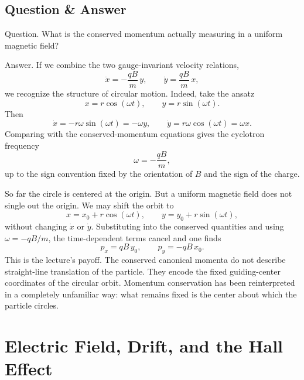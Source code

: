 \subsection{Question \& Answer}

Question. What is the conserved momentum actually measuring in a uniform magnetic field?

Answer. If we combine the two gauge-invariant velocity relations,
\begin{equation}
\dot x=-\frac{qB}{m}\,y,
\qquad
\dot y=\frac{qB}{m}\,x,
\end{equation}
we recognize the structure of circular motion. Indeed, take the ansatz
\begin{equation}
x=r\cos(\omega t),
\qquad
y=r\sin(\omega t).
\end{equation}
Then
\begin{equation}
\dot x=-r\omega\sin(\omega t)=-\omega y,
\qquad
\dot y=r\omega\cos(\omega t)=\omega x.
\end{equation}
Comparing with the conserved-momentum equations gives the cyclotron frequency
\begin{equation}
\omega=-\frac{qB}{m},
\end{equation}
up to the sign convention fixed by the orientation of \(B\) and the sign of the charge.

So far the circle is centered at the origin. But a uniform magnetic field does not single out the origin. We may shift the orbit to
\begin{equation}
x=x_0+r\cos(\omega t),
\qquad
y=y_0+r\sin(\omega t),
\end{equation}
without changing \(\dot x\) or \(\dot y\). Substituting into the conserved quantities and using \(\omega=-qB/m\), the time-dependent terms cancel and one finds
\begin{equation}
p_x=qB\,y_0,
\qquad
p_y=-qB\,x_0.
\end{equation}
This is the lecture's payoff. The conserved canonical momenta do not describe straight-line translation of the particle. They encode the fixed guiding-center coordinates of the circular orbit. Momentum conservation has been reinterpreted in a completely unfamiliar way: what remains fixed is the center about which the particle circles.

\section{Electric Field, Drift, and the Hall Effect}

